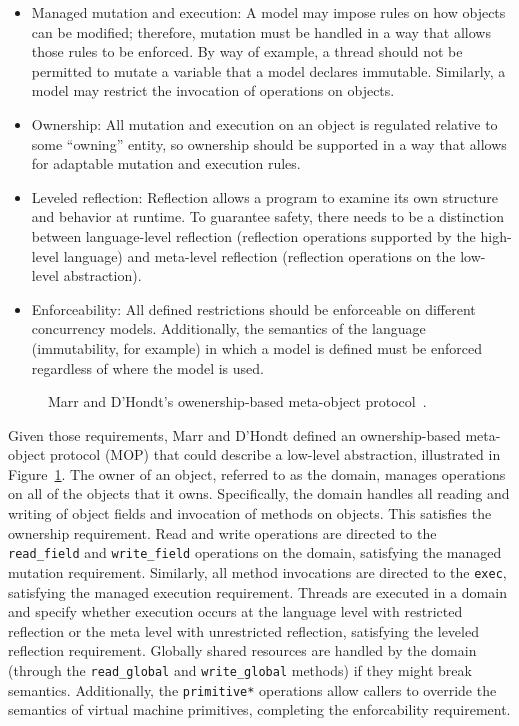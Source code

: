 \documentclass{sig-alternate}
\newcommand{\code}[1]{\texttt{#1}}
\begin{document}
\begin{itemize}
  \item Managed mutation and execution: A model may impose rules on how objects can be modified; therefore, mutation must be handled in a way that allows those rules to be enforced. By way of example, a thread should not be permitted to mutate a variable that a model declares immutable. Similarly, a model may restrict the invocation of operations on objects.

  \item Ownership: All mutation and execution on an object is regulated relative to some ``owning'' entity, so ownership should be supported in a way that allows for adaptable mutation and execution rules.

  \item Leveled reflection: Reflection allows a program to examine its own structure and behavior at runtime. To guarantee safety, there needs to be a distinction between language-level reflection (reflection operations supported by the high-level language) and meta-level reflection (reflection operations on the low-level abstraction).

  \item Enforceability: All defined restrictions should be enforceable on different concurrency models. Additionally, the semantics of the language (immutability, for example) in which a model is defined must be enforced regardless of where the model is used.
\end{itemize}

\begin{figure}[ht]
  \centering
  \resizebox{0.55\linewidth}{!}{}
  \caption{Marr and D'Hondt's owenership-based meta-object protocol~\cite{Marr2012}.}
\label{figure:obmop}
\end{figure}

Given those requirements, Marr and D'Hondt defined an ownership-based meta-object protocol (MOP) that could describe a low-level abstraction, illustrated in Figure~\ref{figure:obmop}. The owner of an object, referred to as the domain, manages operations on all of the objects that it owns. Specifically, the domain handles all reading and writing of object fields and invocation of methods on objects. This satisfies the ownership requirement. Read and write operations are directed to the \code{read\_field} and \code{write\_field} operations on the domain, satisfying the managed mutation requirement. Similarly, all method invocations are directed to the \code{exec}, satisfying the managed execution requirement. Threads are executed in a domain and specify whether execution occurs at the language level with restricted reflection or the meta level with unrestricted reflection, satisfying the leveled reflection requirement. Globally shared resources are handled by the domain (through the \code{read\_global} and \code{write\_global} methods) if they might break semantics. Additionally, the \code{primitive*} operations allow callers to override the semantics of virtual machine primitives, completing the enforcability requirement.
\end{document}
